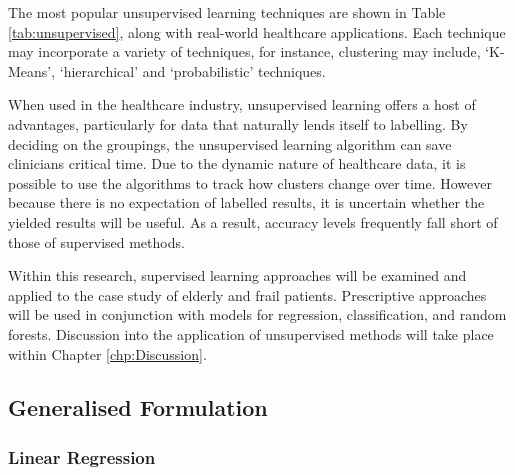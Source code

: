 \documentclass[../thesis.tex]{subfiles}
\begin{document}
The most popular unsupervised learning techniques are shown in Table \ref{tab:unsupervised}, along with real-world healthcare applications. Each technique may incorporate a variety of techniques, for instance, clustering may include, `K-Means', `hierarchical' and `probabilistic' techniques.
\begin{table}[h!]
    \centering{}
    \caption{Unsupervised Learning Models}
    \label{tab:unsupervised}
\end{table}

When used in the healthcare industry, unsupervised learning offers a host of advantages, particularly for data that naturally lends itself to labelling. By deciding on the groupings, the unsupervised learning algorithm can save clinicians critical time. Due to the dynamic nature of healthcare data, it is possible to use the algorithms to track how clusters change over time. However because there is no expectation of labelled results, it is uncertain whether the yielded results will be useful. As a result, accuracy levels frequently fall short of those of supervised methods.

Within this research, supervised learning approaches will be examined and applied to the case study of elderly and frail patients. Prescriptive approaches will be used in conjunction with models for regression, classification, and random forests. Discussion into the application of unsupervised methods will take place within Chapter \ref{chp:Discussion}.

\subsection{Generalised Formulation}

\subsubsection{Linear Regression}
\end{document}
